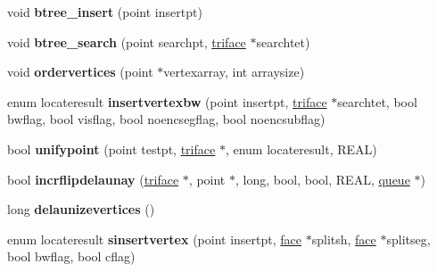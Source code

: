 \begin{DoxyCompactItemize}
\item 
\hypertarget{classtetgenmesh_aecf1ff98d95290e6c28c44cb6898e647}{void {\bfseries btree\-\_\-insert} (point insertpt)}\label{classtetgenmesh_aecf1ff98d95290e6c28c44cb6898e647}

\item 
\hypertarget{classtetgenmesh_a7abb54dda1d6183e9974aae6dcc0c3b2}{void {\bfseries btree\-\_\-search} (point searchpt, \hyperlink{classtetgenmesh_1_1triface}{triface} $\ast$searchtet)}\label{classtetgenmesh_a7abb54dda1d6183e9974aae6dcc0c3b2}

\item 
\hypertarget{classtetgenmesh_a042e252adaa4514a0886d43aae6bd254}{void {\bfseries ordervertices} (point $\ast$vertexarray, int arraysize)}\label{classtetgenmesh_a042e252adaa4514a0886d43aae6bd254}

\item 
\hypertarget{classtetgenmesh_a06c7e9e919cf0b01edb401244ee84171}{enum locateresult {\bfseries insertvertexbw} (point insertpt, \hyperlink{classtetgenmesh_1_1triface}{triface} $\ast$searchtet, bool bwflag, bool visflag, bool noencsegflag, bool noencsubflag)}\label{classtetgenmesh_a06c7e9e919cf0b01edb401244ee84171}

\item 
\hypertarget{classtetgenmesh_af371846f6202c7626e028e37376c4755}{bool {\bfseries unifypoint} (point testpt, \hyperlink{classtetgenmesh_1_1triface}{triface} $\ast$, enum locateresult, R\-E\-A\-L)}\label{classtetgenmesh_af371846f6202c7626e028e37376c4755}

\item 
\hypertarget{classtetgenmesh_a38c9b037b6a6580e66da8adde078245c}{bool {\bfseries incrflipdelaunay} (\hyperlink{classtetgenmesh_1_1triface}{triface} $\ast$, point $\ast$, long, bool, bool, R\-E\-A\-L, \hyperlink{classtetgenmesh_1_1queue}{queue} $\ast$)}\label{classtetgenmesh_a38c9b037b6a6580e66da8adde078245c}

\item 
\hypertarget{classtetgenmesh_aaaa4af8e91e57e1a1a1f8f0b843fa429}{long {\bfseries delaunizevertices} ()}\label{classtetgenmesh_aaaa4af8e91e57e1a1a1f8f0b843fa429}

\item 
\hypertarget{classtetgenmesh_aec80abf41fdc7ceb3b6475dff7924cf3}{enum locateresult {\bfseries sinsertvertex} (point insertpt, \hyperlink{classtetgenmesh_1_1face}{face} $\ast$splitsh, \hyperlink{classtetgenmesh_1_1face}{face} $\ast$splitseg, bool bwflag, bool cflag)}\label{classtetgenmesh_aec80abf41fdc7ceb3b6475dff7924cf3}


\end{DoxyCompactItemize}
